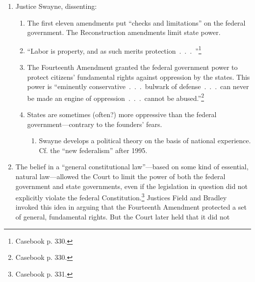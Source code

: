 \begin{enumerate}
\begin{enumerate}
        Constitution and in the Bill of Rights. Now, the Fourteenth Amendment 
        extended the same protections to abridgement by the states.
        \item Ending slavery was not the sole purpose of the Reconstruction 
        amendments. ``It is futile to argue that none but persons of the 
        African race are intended to be benefited by this amendment. They may 
        have been the primary cause of the amendment, but its language is 
        general, embracing all citizens, and I think it was purposely so 
        expressed.''\footnote{Casebook p. 329.}
    \end{enumerate}
    \item Justice Swayne, dissenting:
    \begin{enumerate}
        \item The first eleven amendments put ``checks and limitations'' on 
        the federal government. The Reconstruction amendments limit state 
        power.
        \item ``Labor is property, and as such merits 
        protection~.~.~.~''\footnote{Casebook p. 330.}
        \item The Fourteenth Amendment granted the federal government power to 
        protect citizens' fundamental rights against oppression by the states. 
        This power is ``eminently conservative~.~.~.~bulwark of 
        defense~.~.~.~can never be made an engine of oppression~.~.~.~cannot 
        be abused.''\footnote{Casebook p. 330.}
        \item States are sometimes (often?) more oppressive than the federal 
        government---contrary to the founders' fears.
        \begin{enumerate}
            \item Swayne develops a political theory on the basis of national 
            experience. Cf. the ``new federalism'' after 1995.
        \end{enumerate}
    \end{enumerate}
    \item The belief in a ``general constitutional law''---based on some kind 
    of essential, natural law---allowed the Court to limit the power of both 
    the federal government and state governments, even if the legislation in 
    question did not explicitly violate the federal 
    Constitution.\footnote{Casebook p.  331.} Justices Field and Bradley 
    invoked this idea in arguing that the Fourteenth Amendment protected a set 
    of general, fundamental rights. But the Court later held that it did not 

\end{enumerate}
